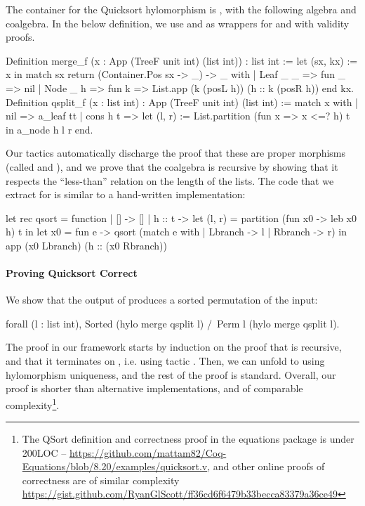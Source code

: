 \documentclass[a4paper,anonymous, UKenglish,cleveref, autoref, thm-restate]{lipics-v2021}
\begin{document}
The container for the Quicksort hylomorphism is , with the
following algebra and coalgebra. In the below definition, we use  and
 as wrappers for  and  with validity proofs.
\begin{coqcode}
Definition merge_f (x : App (TreeF unit int) (list int)) : list int :=
  let (sx, kx) := x in
  match sx return (Container.Pos sx -> _) -> _ with
  | Leaf _ _ => fun _ => nil
  | Node _ h => fun k => List.app (k (posL h)) (h :: k (posR h))
  end kx.
Definition qsplit_f (x : list int) : App (TreeF unit int) (list int) :=
  match x with
  | nil => a_leaf tt
  | cons h t => let (l, r) := List.partition (fun x => x <=? h) t in a_node h l r
  end.
\end{coqcode}
Our tactics automatically discharge the proof that these are proper morphisms
(called  and ), and we prove that the coalgebra
 is recursive by showing that it respects the ``less-than'' relation
on the length of the lists.
%
The code that we extract for  is similar to a hand-written implementation:
\begin{ocamlcode}
let rec qsort = function
  | [] -> []
  | h :: t -> let (l, r) = partition (fun x0 -> leb x0 h) t in
    let x0 = fun e -> qsort (match e with | Lbranch -> l | Rbranch -> r) in
    app (x0 Lbranch) (h :: (x0 Rbranch))
\end{ocamlcode}

\paragraph*{Proving Quicksort Correct}

We show that the output of  produces a sorted
permutation of the input:
\begin{coqcode}
forall (l : list int), Sorted (hylo merge qsplit l) /\ Perm l (hylo merge qsplit l).
\end{coqcode}
The proof in our framework starts by induction on the proof that 
is recursive, and that it terminates on , i.e. using tactic
. Then, we can unfold
 to  using
hylomorphism uniqueness, and the rest of the proof is standard. Overall, our
proof is shorter than alternative implementations, and of comparable
complexity\footnote{The QSort definition and correctness proof in the equations
package is under 200LOC --
\href{https://github.com/mattam82/Coq-Equations/blob/8.20/examples/quicksort.v}{https://github.com/mattam82/Coq-Equations/blob/8.20/examples/quicksort.v},
and other online proofs of correctness are of similar complexity
\href{https://gist.github.com/RyanGlScott/ff36cd6f6479b33becca83379a36ce49}{https://gist.github.com/RyanGlScott/ff36cd6f6479b33becca83379a36ce49}}.
\end{document}
